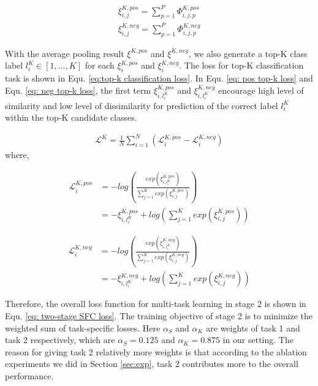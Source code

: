 \documentclass[letterpaper]{article} %
\begin{document}
  \begin{align}
    {\xi}_{i,j}^{K,pos} = \sum_{p=1}^{P}{\varPhi}_{i,j,p}^{K,pos} \label{eq:average pooling:1}\\
    {\xi}_{i,j}^{K,neg} = \sum_{p=1}^{P}{\varPhi}_{i,j,p}^{K,neg}
    \label{eq:average pooling:2}
  \end{align}

  With  the  average pooling result ${\xi}^{K,pos}$ and ${\xi}^{K,neg}$, we also
  generate   a   top-K   class   label   $l^{K}_i\in   [1,\dots,K]$   for   each
  ${\xi}^{K,pos}_{i}$ and ${\xi}^{K,neg}_{i}$. The loss for top-K classification
  task is shown in Equ. \ref{eq:top-k classification loss}. In Equ. \ref{eq: pos
  top-k   loss}   and   Equ.   \ref{eq:   neg   top-k   loss},  the  first  term
  $\xi_{i,l^{K}_{i}}^{K,pos}$  and  $\xi_{i,l^{K}_{i}}^{K,neg}$  encourage  high
  level  of  similarity  and  low  level  of dissimilarity for prediction of the
  correct label $l^{K}_i$ within the top-K candidate classes.

  \begin{align}
    \mathcal{L}^{K} = \frac{1}{N}\sum_{i=1}^{N}(\mathcal{L}^{K,pos}_{i} - \mathcal{L}^{K,neg}_{i})
    \label{eq:top-k classification loss}
  \end{align}
  where,

  \begin{equation}
    \begin{aligned}
      \mathcal{L}^{K,pos}_{i} &= -log(\frac{exp(\xi_{i,l^{K}_{i}}^{K,pos})}{\sum_{j=1}^{K}exp(\xi_{i,j}^{K,pos})}) \\
      &= -\xi_{i,l^{K}_{i}}^{K,pos} + log(\sum_{j=1}^{K}exp(\xi_{i,j}^{K,pos}))
      \label{eq: pos top-k loss}
    \end{aligned}
  \end{equation}

  \begin{equation}
    \begin{aligned}
      \mathcal{L}^{K,neg}_{i} &= -log(\frac{exp(\xi_{i,l^{K}_{i}}^{K,neg})}{\sum_{j=1}^{K}exp(\xi_{i,j}^{K,neg})}) \\
      &= -\xi_{i,l^{K}_{i}}^{K,neg} + log(\sum_{j=1}^{K}exp(\xi_{i,j}^{K,neg}))
      \label{eq: neg top-k loss}
    \end{aligned}
  \end{equation}

  Therefore,  the  overall  loss  function for multi-task learning in stage 2 is
  shown in Equ. \ref{eq: two-stage SFC loss}. The training objective of stage 2 is
  to  minimize  the  weighted  sum  of task-specific losses. Here $\alpha_S$ and
  $\alpha_K$  are  weights  of  task  1  and  task  2  respectively,  which  are
  $\alpha_S=0.125$ and $\alpha_K=0.875$ in our setting. The reason for giving task 2 relatively more weights is that according to the ablation experiments we did in Section \ref{sec:exp}, task 2 contributes more to the overall performance. 
\end{document}
